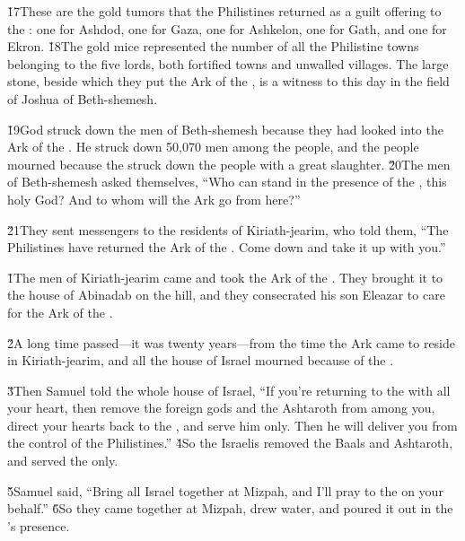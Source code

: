 \v{17}These are the gold tumors that the Philistines returned as a guilt offering to the : one for Ashdod, one for Gaza, one for Ashkelon, one for Gath, and one for Ekron. \v{18}The gold mice represented the number of all the Philistine towns belonging to the five lords, both fortified towns and unwalled villages. The large stone, beside which they put the Ark of the , is a witness to this day in the field of Joshua of Beth-shemesh.

\v{19}God struck down the men of Beth-shemesh because they had looked into the Ark of the . He struck down 50,070 men among the people, and the people mourned because the  struck down the people with a great slaughter. \v{20}The men of Beth-shemesh asked themselves, ``Who can stand in the presence of the , this holy God? And to whom will the Ark go from here?''

\v{21}They sent messengers to the residents of Kiriath-jearim, who told them, ``The Philistines have returned the Ark of the . Come down and take it up with you.''

\v{1}The men of Kiriath-jearim came and took the Ark of the . They brought it to the house of Abinadab on the hill, and they consecrated his son Eleazar to care for the Ark of the .

\v{2}A long time passed---it was twenty years---from the time the Ark came to reside in Kiriath-jearim, and all the house of Israel mourned because of the .

\v{3}Then Samuel told the whole house of Israel, ``If you're returning to the  with all your heart, then remove the foreign gods and the Ashtaroth from among you, direct your hearts back to the , and serve him only. Then he will deliver you from the control of the Philistines.'' \v{4}So the Israelis removed the Baals and Ashtaroth, and served the  only.

\v{5}Samuel said, ``Bring all Israel together at Mizpah, and I'll pray to the  on your behalf.'' \v{6}So they came together at Mizpah, drew water, and poured it out in the 's presence.

